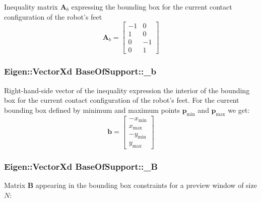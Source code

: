 \-Inequality matrix $\mathbf{A}_b$ expressing the bounding box for the current contact configuration of the robot's feet \[ \mathbf{A}_b = \left[\begin{array}{cc} -1 & 0\\ 1 & 0\\ 0 & -1\\ 0 & 1 \end{array}\right] \] \hypertarget{classBaseOfSupport_a9a77c3e98a73065f60b99e888c50fcc7}{
\subsubsection[{\-\_\-b}]{\setlength{\rightskip}{0pt plus 5cm}\-Eigen\-::\-Vector\-Xd {\bf \-Base\-Of\-Support\-::\-\_\-b}}}\label{classBaseOfSupport_a9a77c3e98a73065f60b99e888c50fcc7}
\-Right-\/hand-\/side vector of the inequality expression the interior of the bounding box for the current contact configuration of the robot's feet. \-For the current bounding box defined by minimum and maximum points $\mathbf{p}_{\text{min}}$ and $\mathbf{p}_{\text{max}}$ we get\-: \[ \mathbf{b} = \left[ \begin{array}{c} -x_{\text{min}}\\ x_{\text{max}}\\ -y_{\text{min}}\\ y_{\text{max}} \end{array} \right] \] \hypertarget{classBaseOfSupport_adfa70199064a50d9d7aea9a6d4b13246}{
\subsubsection[{\-\_\-\-B}]{\setlength{\rightskip}{0pt plus 5cm}\-Eigen\-::\-Vector\-Xd {\bf \-Base\-Of\-Support\-::\-\_\-\-B}}}\label{classBaseOfSupport_adfa70199064a50d9d7aea9a6d4b13246}
\-Matrix $\mathbf{B}$ appearing in the bounding box constraints for a preview window of size $N$\-:

